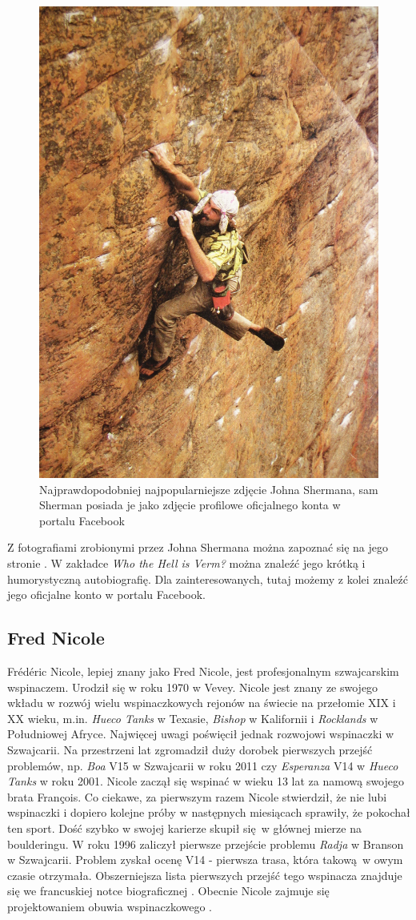 \documentclass{article}
\begin{document}
\begin{figure}[!htbp]
	\begin{center}
		\includegraphics[width=0.5\linewidth]{images/john-sherman.eps}
	\end{center}
	\caption{Najprawdopodobniej najpopularniejsze zdjęcie Johna Shermana, sam Sherman posiada je jako zdjęcie profilowe oficjalnego konta w portalu Facebook \cite{js-photo}}
\end{figure}

Z fotografiami zrobionymi przez Johna Shermana można zapoznać się na jego stronie \cite{vermphoto}. W zakładce \textit{Who the Hell is Verm?} można znaleźć jego krótką i humorystyczną autobiografię. Dla zainteresowanych, tutaj \cite{vermfb} możemy z kolei znaleźć jego oficjalne konto w portalu Facebook. 

\subsection{Fred Nicole}
Frédéric Nicole, lepiej znany jako Fred Nicole, jest profesjonalnym szwajcarskim wspinaczem. Urodził się w roku 1970 w Vevey. Nicole jest znany ze swojego wkładu w rozwój wielu wspinaczkowych rejonów na świecie na przełomie XIX i XX wieku, m.in. \textit{Hueco Tanks} w Texasie, \textit{Bishop} w Kalifornii i \textit{Rocklands} w Południowej Afryce. Najwięcej uwagi poświęcił jednak rozwojowi wspinaczki w Szwajcarii. Na przestrzeni lat zgromadził duży dorobek pierwszych przejść problemów, np. \textit{Boa} V15 w Szwajcarii w roku 2011 czy \textit{Esperanza} V14 w \textit{Hueco Tanks} w roku 2001. Nicole zaczął się wspinać w wieku 13 lat za namową swojego brata François. Co ciekawe, za pierwszym razem Nicole stwierdził, że nie lubi wspinaczki i dopiero kolejne próby w następnych miesiącach sprawiły, że pokochał ten sport. Dość szybko w swojej karierze skupił się w głównej mierze na boulderingu. W roku 1996 zaliczył pierwsze przejście problemu \textit{Radja} w Branson w Szwajcarii. Problem zyskał ocenę V14 - pierwsza trasa, która takową w owym czasie otrzymała. Obszerniejsza lista pierwszych przejść tego wspinacza znajduje się we francuskiej notce biograficznej \cite{wiki-nicole}. Obecnie Nicole zajmuje się projektowaniem obuwia wspinaczkowego \cite{climb-nicole}.
\end{document}
